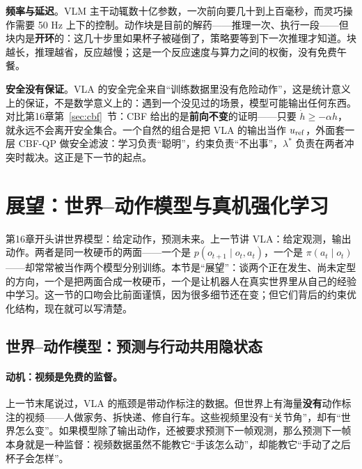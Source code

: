 \textbf{频率与延迟}。VLM 主干动辄数十亿参数，一次前向要几十到上百毫秒，而灵巧操作需要 50 Hz 上下的控制。动作块是目前的解药——推理一次、执行一段——但块内是\textbf{开环}的：这几十步里如果杯子被碰倒了，策略要等到下一次推理才知道。块越长，推理越省，反应越慢；这是一个反应速度与算力之间的权衡，没有免费午餐。

\textbf{安全没有保证}。VLA 的安全完全来自“训练数据里没有危险动作”，这是统计意义上的保证，不是数学意义上的：遇到一个没见过的场景，模型可能输出任何东西。对比第16章第~\ref{sec:cbf}~节：CBF 给出的是\textbf{前向不变}的证明——只要 $\dot{h} \ge -\alpha h$，就永远不会离开安全集合。一个自然的组合是把 VLA 的输出当作 $u_{\rm ref}$，外面套一层 CBF-QP 做安全滤波：学习负责“聪明”，约束负责“不出事”，$\lambda^*$ 负责在两者冲突时裁决。这正是下一节的起点。

\section{展望：世界--动作模型与真机强化学习}

第16章开头讲世界模型：给定动作，预测未来。上一节讲 VLA：给定观测，输出动作。两者是同一枚硬币的两面——一个是 $p(o_{t+1} \mid o_t, a_t)$，一个是 $\pi(a_t \mid o_t)$——却常常被当作两个模型分别训练。本节是“展望”：谈两个正在发生、尚未定型的方向，一个是把两面合成一枚硬币，一个是让机器人在真实世界里从自己的经验中学习。这一节的口吻会比前面谨慎，因为很多细节还在变；但它们背后的约束优化结构，现在就可以写清楚。

\subsection{世界--动作模型：预测与行动共用隐状态}

\paragraph{动机：视频是免费的监督。}
上一节末尾说过，VLA 的瓶颈是带动作标注的数据。但世界上有海量\textbf{没有}动作标注的视频——人做家务、拆快递、修自行车。这些视频里没有“关节角”，却有“世界怎么变”。如果模型除了输出动作，还被要求预测下一帧观测，那么预测下一帧本身就是一种监督：视频数据虽然不能教它“手该怎么动”，却能教它“手动了之后杯子会怎样”。

